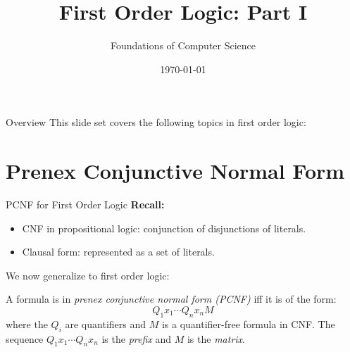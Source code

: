 \documentclass[style=sailor,size=12pt]{powerdot}
\title{First Order Logic: Part I}
\author{Foundations of Computer Science}
\date{\today}
\begin{document}
\maketitle
\begin{slide}[toc=,bm=]{Overview}
This slide set covers the following topics in first order logic:

\vspace{5mm}
\tableofcontents[content=sections]
\end{slide}
\section[slide=false]{Prenex Conjunctive Normal Form}

\begin{wideslide}[bm=,toc=]{PCNF for First Order Logic}
{\bf Recall:}
\begin{itemize}
\item CNF in propositional logic: conjunction of disjunctions of literals.
\item Clausal form: represented as a set of literals.
\end{itemize}
We now generalize to first order logic:
\begin{defn}{9.9}
A formula is in \emph{prenex conjunctive normal form (PCNF)} iff it is of the
form:
\[
  Q_1x_1\cdots Q_n x_n M
  \]
  where the $Q_i$ are quantifiers and $M$ is a quantifier-free formula in CNF.
  The sequence $Q_1x_1 \cdots Q_n x_n$ is the \emph{prefix} and $M$ is the
  \emph{matrix}.
\end{defn}

\end{wideslide}
\end{document}
